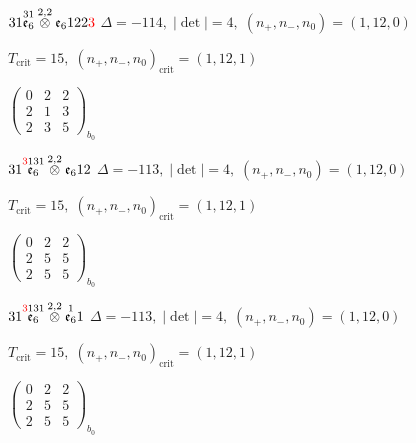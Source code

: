 \documentclass[10pt]{article}
\begin{document}
\smallskip

$31\overset{31}{\mathfrak{e}_6}\overset{2,2}{\otimes}\mathfrak{e}_6122\textcolor{red}{3}$ \quad $\Delta=-114,\; |\det|=4,\; (n_+,n_-,n_0)=(1,12,0)$

\hspace{1em}$T_{\text{crit}}=15,\; (n_+,n_-,n_0)_{\text{crit}}=(1,12,1)$

\hspace{2em}$\left(\begin{smallmatrix}0 & 2 & 2 \\ 2 & 1 & 3 \\ 2 & 3 & 5\end{smallmatrix}\right)_{\!b_0}$

\smallskip

$31\overset{\textcolor{red}{3}131}{\mathfrak{e}_6}\overset{2,2}{\otimes}\mathfrak{e}_612$ \quad $\Delta=-113,\; |\det|=4,\; (n_+,n_-,n_0)=(1,12,0)$

\hspace{1em}$T_{\text{crit}}=15,\; (n_+,n_-,n_0)_{\text{crit}}=(1,12,1)$

\hspace{2em}$\left(\begin{smallmatrix}0 & 2 & 2 \\ 2 & 5 & 5 \\ 2 & 5 & 5\end{smallmatrix}\right)_{\!b_0}$

\smallskip

$31\overset{\textcolor{red}{3}131}{\mathfrak{e}_6}\overset{2,2}{\otimes}\overset{1}{\mathfrak{e}_6}1$ \quad $\Delta=-113,\; |\det|=4,\; (n_+,n_-,n_0)=(1,12,0)$

\hspace{1em}$T_{\text{crit}}=15,\; (n_+,n_-,n_0)_{\text{crit}}=(1,12,1)$

\hspace{2em}$\left(\begin{smallmatrix}0 & 2 & 2 \\ 2 & 5 & 5 \\ 2 & 5 & 5\end{smallmatrix}\right)_{\!b_0}$

\smallskip
\end{document}
